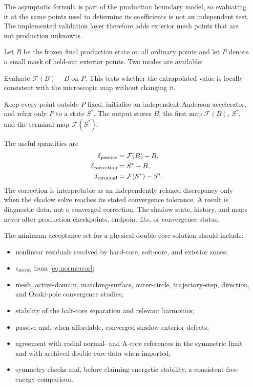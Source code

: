 \documentclass[11pt,a4paper]{article}
\newcommand{\Fmap}{\mathcal{F}}
\newcommand{\code}[1]{\texttt{\detokenize{#1}}}
\begin{document}
The asymptotic formula is part of the production boundary model, so evaluating
it at the same points used to determine its coefficients is not an independent
test.  The implemented validation layer therefore adds exterior mesh points
that are not production unknowns.

Let $B$ be the frozen final production state on all ordinary points and let
$P$ denote a small mask of held-out exterior points.  Two modes are available:
\begin{description}[leftmargin=31mm,style=nextline]
  \item[Passive defect] Evaluate $\Fmap(B)-B$ on $P$.  This tests whether the
  extrapolated value is locally consistent with the microscopic map without
  changing it.
  \item[Shadow iteration] Keep every point outside $P$ fixed, initialise an
  independent Anderson accelerator, and relax only $P$ to a state $S^*$.  The
  output stores $B$, the first map $\Fmap(B)$, $S^*$, and the terminal map
  $\Fmap(S^*)$.
\end{description}
The useful quantities are
\begin{align}
  \delta_{\rm passive}&=\Fmap(B)-B,\\
  \delta_{\rm correction}&=S^*-B,\\
  \delta_{\rm terminal}&=\Fmap(S^*)-S^*.
  \label{eq:shadow}
\end{align}
The correction is interpretable as an independently relaxed discrepancy only
when the shadow solve reaches its stated convergence tolerance.  A
\code{shadow_not_converged} result is diagnostic data, not a converged
correction.  The shadow state, history, and maps never alter production
checkpoints, endpoint fits, or convergence status.

The minimum acceptance set for a physical double-core solution should include:
\begin{itemize}
  \item nonlinear residuals resolved by hard-core, soft-core, and exterior
  zones;
  \item $\epsilon_{\rm norm}$ from \eqref{eq:normerror};
  \item mesh, active-domain, matching-surface, outer-circle, trajectory-step,
  direction, and Ozaki-pole convergence studies;
  \item stability of the half-core separation and relevant harmonics;
  \item passive and, when affordable, converged shadow exterior defects;
  \item agreement with radial normal- and A-core references in the symmetric
  limit and with archived double-core data when imported;
  \item symmetry checks and, before claiming energetic stability, a consistent
  free-energy comparison.
\end{itemize}
\end{document}
